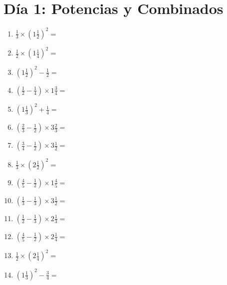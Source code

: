 \documentclass[12pt]{article}
\begin{document}
\section*{Día 1: Potencias y Combinados}
\begin{enumerate}
\item \large $ \frac{1}{3} \times \left( 1 \frac{1}{2} \right)^2 = $ \vspace{1.6cm}
\item \large $ \frac{1}{2} \times \left( 1 \frac{1}{4} \right)^2 = $ \vspace{1.6cm}
\item \large $ \left( 1 \frac{1}{2} \right)^2 - \frac{1}{2} = $ \vspace{1.6cm}
\item \large $ \left( \frac{1}{2} - \frac{1}{4} \right) \times 1 \frac{3}{4} = $ \vspace{1.6cm}
\item \large $ \left( 1 \frac{1}{3} \right)^2 + \frac{1}{4} = $ \vspace{1.6cm}
\item \large $ \left( \frac{2}{3} - \frac{1}{2} \right) \times 3 \frac{2}{3} = $ \vspace{1.6cm}
\item \large $ \left( \frac{3}{4} - \frac{1}{2} \right) \times 3 \frac{1}{2} = $ \vspace{1.6cm}
\item \large $ \frac{1}{3} \times \left( 2 \frac{1}{2} \right)^2 = $ \vspace{1.6cm}
\item \large $ \left( \frac{4}{5} - \frac{1}{2} \right) \times 1 \frac{4}{5} = $ \vspace{1.6cm}
\item \large $ \left( \frac{1}{3} - \frac{1}{3} \right) \times 3 \frac{1}{2} = $ \vspace{1.6cm}
\newpage
\item \large $ \left( \frac{1}{2} - \frac{1}{3} \right) \times 2 \frac{1}{3} = $ \vspace{1.6cm}
\item \large $ \left( \frac{4}{5} - \frac{1}{2} \right) \times 2 \frac{1}{4} = $ \vspace{1.6cm}
\item \large $ \frac{1}{2} \times \left( 2 \frac{1}{4} \right)^2 = $ \vspace{1.6cm}
\item \large $ \left( 1 \frac{1}{3} \right)^2 - \frac{3}{4} = $ \vspace{1.6cm}

\end{enumerate}
\end{document}
